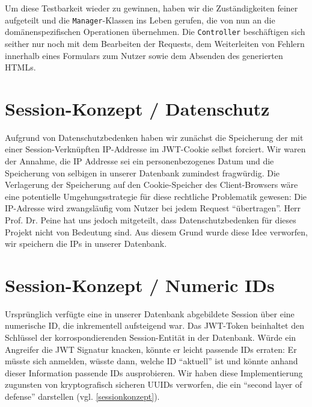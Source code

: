 \documentclass[12pt,DIV14,BCOR10mm,a4paper,parskip=half-,headsepline,headinclude,english,ngerman,bibliography=totocnumbered]{scrreprt}
\begin{document}
Um diese Testbarkeit wieder zu gewinnen, haben wir die Zuständigkeiten feiner aufgeteilt und die \texttt{Manager}-Klassen ins Leben gerufen, die von nun an die domänenspezifischen Operationen übernehmen.
Die \texttt{Controller} beschäftigen sich seither nur noch mit dem Bearbeiten der Requests, dem Weiterleiten von Fehlern innerhalb eines Formulars zum Nutzer sowie dem Absenden des generierten HTMLs.

\section{Session-Konzept / Datenschutz}
Aufgrund von Datenschutzbedenken haben wir zunächst die Speicherung der mit einer Session-Verknüpften IP-Addresse im JWT-Cookie selbst forciert. Wir waren der Annahme, die IP Addresse sei ein personenbezogenes Datum und die Speicherung von selbigen in unserer Datenbank zumindest fragwürdig. Die Verlagerung der Speicherung auf den Cookie-Speicher des Client-Browsers wäre eine potentielle Umgehungsstrategie für diese rechtliche Problematik gewesen: Die IP-Adresse wird zwangsläufig vom Nutzer bei jedem Request \enquote{übertragen}. Herr Prof. Dr. Peine hat uns jedoch mitgeteilt, dass Datenschutzbedenken für dieses Projekt nicht von Bedeutung sind. Aus diesem Grund wurde diese Idee verworfen, wir speichern die IPs in unserer Datenbank.

\section{Session-Konzept / Numeric IDs}
Ursprünglich verfügte eine in unserer Datenbank abgebildete Session über eine numerische ID, die inkrementell aufsteigend war. Das JWT-Token beinhaltet den Schlüssel der korrospondierenden Session-Entität in der Datenbank. Würde ein Angreifer die JWT Signatur knacken, könnte er leicht passende IDs erraten: Er müsste sich anmelden, wüsste dann, welche ID \enquote{aktuell} ist und könnte anhand dieser Information passende IDs ausprobieren. Wir haben diese Implementierung zugunsten von kryptografisch sicheren UUIDs verworfen, die ein \enquote{second layer of defense} darstellen (vgl. \ref{sessionkonzept}).
\end{document}
